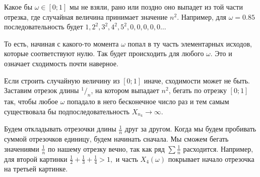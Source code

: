 \documentclass[12pt, a4paper, oneside]{article}
\begin{document}
Какое бы $\omega \in [0;1]$ мы не взяли, рано или поздно оно выпадет из той части отрезка, где случайная величина принимает значение $n^2$. Например, для $\omega = 0.85$ последовательность будет $1, 2^2, 3^2, 4^2, 5^2, 0, 0, 0, 0, 0 \ldots$

То есть, начиная с какого-то момента $\omega$ попал в ту часть элементарных исходов, которые соответствуют нулю. Так будет происходить для любого $\omega$. Это и означает сходимость почти наверное. 

Если строить случайную величину из $[0;1]$ иначе, сходимости может не быть. Заставим отрезок длины $^1/_n$, на котором выпадает $n^2$, бегать по отрезку $[0; 1]$ так, чтобы любое $\omega$ попадало в него бесконечное число раз и тем самым существовала бы подпоследовательность $X_{n_k} \to \infty$. 

Будем откладывать отрезочки длины $\frac{1}{n}$ друг за другом. Когда мы будем пробивать суммой отрезочков единицу, будем начинать сначала. Мы сможем бегать значениями $\frac{1}{n}$ по нашему отрезку вечно, так как ряд $\sum \frac{1}{n}$ расходится. Например, для второй картинки $\frac{1}{2} + \frac{1}{3} + \frac{1}{4} > 1,$ и часть $X_4(\omega)$ покрывает начало отрезочка на третьей картинке. 
\end{document}
